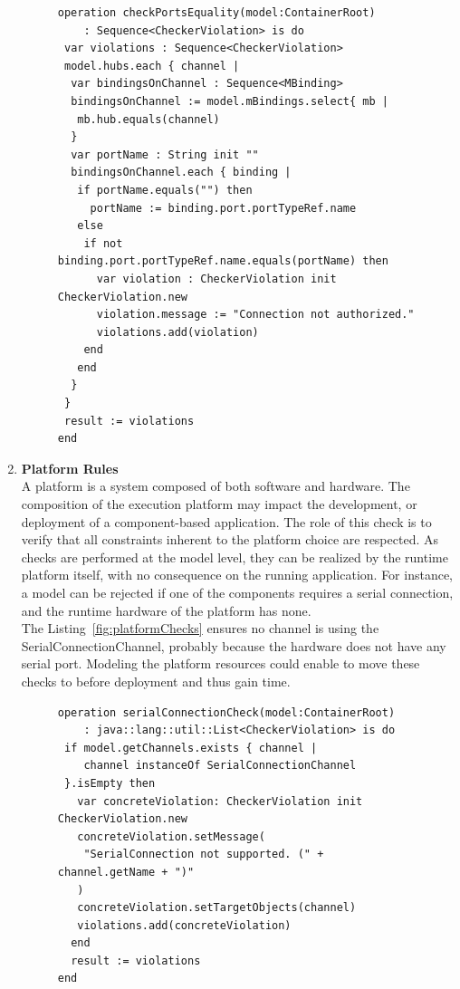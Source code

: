 \begin{enumerate}
\begin{figure}[h!]
\vspace{-0,3cm}
\centering
\begin{lstlisting}[caption=Example checking identical port names,label=fig:checkBusiness,basicstyle=\scriptsize\ttfamily,tabsize=1 ]
operation checkPortsEquality(model:ContainerRoot)
	: Sequence<CheckerViolation> is do
 var violations : Sequence<CheckerViolation>
 model.hubs.each { channel |
  var bindingsOnChannel : Sequence<MBinding>
  bindingsOnChannel := model.mBindings.select{ mb |
   mb.hub.equals(channel)
  }
  var portName : String init ""
  bindingsOnChannel.each { binding |
   if portName.equals("") then
     portName := binding.port.portTypeRef.name
   else 
    if not binding.port.portTypeRef.name.equals(portName) then 
      var violation : CheckerViolation init CheckerViolation.new
      violation.message := "Connection not authorized."
	  violations.add(violation)
    end
   end
  }
 }
 result := violations
end
\end{lstlisting} 
\vspace{-0,4cm}
\end{figure}

\item {\bf Platform Rules}\\
A platform is a system composed of both software and hardware. The composition of the execution platform may impact the development, or deployment of a component-based application. The role of this check is to verify that all constraints inherent to the platform choice are respected. As checks are performed at the model level, they can be realized by the runtime platform itself, with no consequence on the running application. For instance, a model can be rejected if one of the components requires a serial connection, and the runtime hardware of the platform has none.\\
The Listing~\ref{fig:platformChecks} ensures no channel is using the SerialConnectionChannel, probably because the hardware does not have any serial port. Modeling the platform resources could enable to move these checks to before deployment and thus gain time.

\begin{figure}[h!]
\centering
\begin{lstlisting}[caption=Example checking pre-deploy constraints,label=fig:platformChecks,basicstyle=\scriptsize\ttfamily,tabsize=1 ]
operation serialConnectionCheck(model:ContainerRoot)
	: java::lang::util::List<CheckerViolation> is do
 if model.getChannels.exists { channel |
 	channel instanceOf SerialConnectionChannel
 }.isEmpty then
   var concreteViolation: CheckerViolation init CheckerViolation.new
   concreteViolation.setMessage(
    "SerialConnection not supported. (" + channel.getName + ")"
   )
   concreteViolation.setTargetObjects(channel)
   violations.add(concreteViolation)
  end
  result := violations
end
\end{lstlisting} 
\vspace{-0,3cm}
\end{figure}


\end{enumerate}
